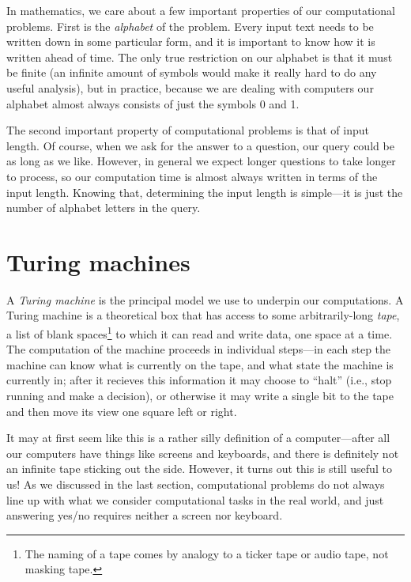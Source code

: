 \documentclass[english,12pt]{reedthesis}
\theoremstyle{plain}
\theoremstyle{definition}
\theoremstyle{remark}
\begin{document}
In mathematics, we care about a few important properties of our computational
problems. First is the \emph{alphabet} of the problem. Every input text needs to
be written down in some particular form, and it is important to know how it is
written ahead of time. The only true restriction on our alphabet is that it must
be finite (an infinite amount of symbols would make it really hard to do any
useful analysis), but in practice, because we are dealing with computers our
alphabet almost always consists of just the symbols 0 and 1.

The second important property of computational problems is that of input length.
Of course, when we ask for the answer to a question, our query could be as long
as we like. However, in general we expect longer questions to take longer to
process, so our computation time is almost always written in terms of the input
length. Knowing that, determining the input length is simple---it is just the
number of alphabet letters in the query.

\section{Turing machines}

A \emph{Turing machine} is the principal model we use to underpin our
computations. A Turing machine is a theoretical box that has access to some
arbitrarily-long \emph{tape}, a list of blank spaces\footnote{The naming of a
  tape comes by analogy to a ticker tape or audio tape, not masking tape.} to
which it can read and write data, one space at a time. The computation of the
machine proceeds in individual steps---in each step the machine can know what is
currently on the tape, and what state the machine is currently in; after it
recieves this information it may choose to ``halt'' (i.e., stop running and make
a decision), or otherwise it may write a single bit to the tape and then move
its view one square left or right.

It may at first seem like this is a rather silly definition of a computer---after
all our computers have things like screens and keyboards, and there is
definitely not an infinite tape sticking out the side. However, it turns out
this is still useful to us! As we discussed in the last section, computational
problems do not always line up with what we consider computational tasks in the
real world, and just answering yes/no requires neither a screen nor keyboard.
\end{document}
